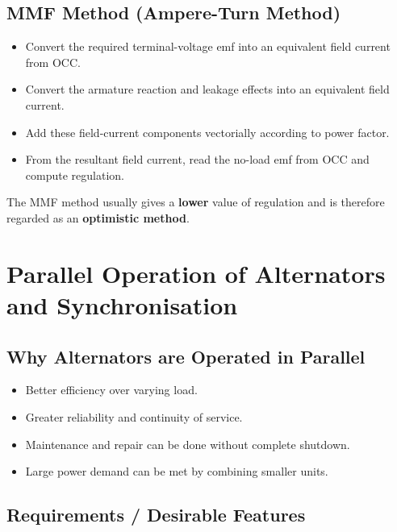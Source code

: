 \documentclass[12pt,a4paper]{article}
\begin{document}
\subsection{MMF Method (Ampere-Turn Method)}

\begin{studybox}
\begin{itemize}[leftmargin=*]
  \item Convert the required terminal-voltage emf into an equivalent field current from OCC.
  \item Convert the armature reaction and leakage effects into an equivalent field current.
  \item Add these field-current components vectorially according to power factor.
  \item From the resultant field current, read the no-load emf from OCC and compute regulation.
\end{itemize}
\end{studybox}

\begin{notebox}
The MMF method usually gives a \textbf{lower} value of regulation and is therefore regarded as an \textbf{optimistic method}.
\end{notebox}

\section{Parallel Operation of Alternators and Synchronisation}

\subsection{Why Alternators are Operated in Parallel}

\begin{itemize}[leftmargin=*]
  \item Better efficiency over varying load.
  \item Greater reliability and continuity of service.
  \item Maintenance and repair can be done without complete shutdown.
  \item Large power demand can be met by combining smaller units.
\end{itemize}

\subsection{Requirements / Desirable Features}
\end{document}
